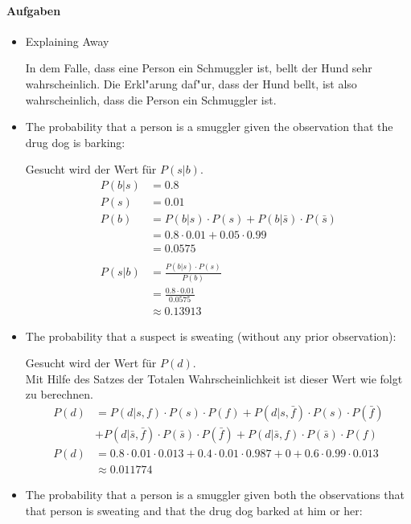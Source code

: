 \documentclass[DIV=9,numbers=noenddot]{scrartcl}
\begin{document}
		\paragraph{Aufgaben}
			\begin{itemize}
				\item Explaining Away
				\par
				In dem Falle, dass eine Person ein Schmuggler ist, bellt der Hund sehr wahrscheinlich.
				Die Erkl"arung daf"ur, dass der Hund bellt, ist also wahrscheinlich, dass die Person ein Schmuggler ist.
				\item The probability that a person is a smuggler given the observation that the drug dog is barking:
				\par
				Gesucht wird der Wert für $P(s|b)$.
				\begin{align*}
					P(b|s) &= 0.8
					\\P(s) &= 0.01
					\\P(b) &= P(b|s) \cdot P(s) + P(b|\bar{s}) \cdot P(\bar{s})
					\\&= 0.8 \cdot 0.01 + 0.05 \cdot 0.99
					\\&= 0.0575
					\\
					\\P(s|b) &= \frac{P(b|s) \cdot P(s)}{P(b)}
					\\&=\frac{0.8 \cdot 0.01}{0.0575}
					\\&\approx 0.13913
				\end{align*}
				\item The probability that a suspect is sweating (without any prior observation):
				\par
				Gesucht wird der Wert für $P(d)$. \\
				Mit Hilfe des Satzes der Totalen Wahrscheinlichkeit ist dieser Wert wie folgt zu berechnen.
				\begin{align*}
					P(d) &= P(d|s,f) \cdot P(s) \cdot P(f) + P(d|s,\bar{f}) \cdot P(s) \cdot P(\bar{f}) \\
					& + P(d|\bar{s},\bar{f}) \cdot P(\bar{s}) \cdot P(\bar{f}) + P(d|\bar{s},f) \cdot P(\bar{s}) \cdot P(f) \\
					P(d) &= 0.8 \cdot 0.01 \cdot 0.013 + 0.4 \cdot 0.01 \cdot 0.987 + 0 + 0.6 \cdot 0.99 \cdot 0.013 \\
					&\approx 0.011774
				\end{align*}
				\item The probability that a person is a smuggler given both the observations that
				that person is sweating and that the drug dog barked at him or her:

\end{itemize}
\end{document}
